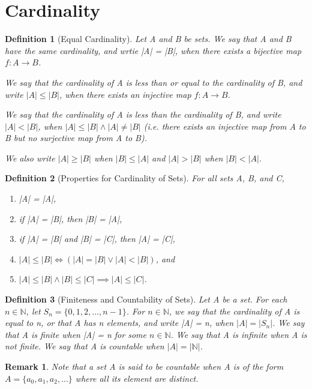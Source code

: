 \documentclass[11pt, oneside]{book}
\theoremstyle{break}
\newtheorem*{remark}{Remark}
\newtheorem{defn}{Definition}[section]
\newcommand{\bb}[1]{\mathbb{#1}}		%
\begin{document}
\section{Cardinality}

\begin{defn}[Equal Cardinality]
	Let A and B be sets. We say that A and B have the same cardinality, and wrtie |A| = |B|, when there exists a bijective map $f: A \to B$.

	We say that the cardinality of A is less than or equal to the cardinality of B, and write $|A| \leq |B|$, when there exists an injective map $f: A \to B$.

	We say that the cardinality of A is less than the cardinality of B, and write $|A| < |B|$, when $|A| \leq |B| \land |A| \neq |B|$ (i.e. there exists an injective map from A to B but no surjective map from A to B).

	We also write $|A| \geq |B|$ when $|B| \leq |A|$ and $|A| > |B|$ when $|B| < |A|$.
\end{defn}

\begin{defn}[Properties for Cardinality of Sets]
	For all sets A, B, and C,
	\begin{enumerate}
		\item |A| = |A|,
		\item if |A| = |B|, then |B| = |A|,
		\item if |A| = |B| and |B| = |C|, then |A| = |C|,
		\item $|A| \leq |B| \iff (|A| = |B| \lor |A| < |B|)$, and
		\item $|A| \leq |B| \land |B| \leq |C| \implies |A| \leq |C|$.
	\end{enumerate}
\end{defn}

\begin{defn}[Finiteness and Countability of Sets]
	Let A be a set. For each $n \in \bb{N}$, let $S_n = \{0, 1, 2, ..., n - 1\}$. For $n \in \bb{N}$, we say that the cardinality of A is equal to n, or that A has n elements, and write |A| = n, when $|A| = |S_n|$. We say that A is finite when |A| = n for some $n \in \bb{N}$. We say that A is infinite when A is not finite. We say that A is countable when $|A| = |\bb{N}|$.
\end{defn}

\begin{remark}
	Note that a set A is said to be countable when A is of the form $A = \{a_0, a_1, a_2, ...\}$ where all its element are distinct.
\end{remark}
\end{document}
